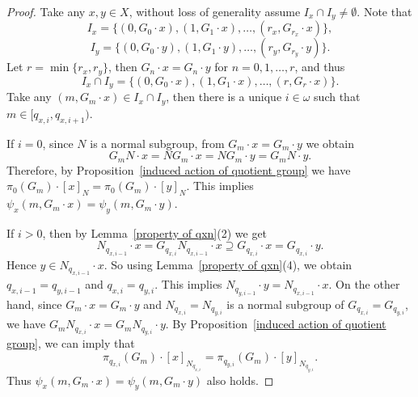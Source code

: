 \documentclass[11pt]{amsart}
\theoremstyle{definition}
\theoremstyle{remark}
\numberwithin{equation}{section}
\begin{document}
\begin{proof}
Take any $x,y\in X$, without loss of generality assume $I_x\cap I_y\neq\emptyset$. Note that
$$I_x=\{(0,G_0\cdot x),(1,G_1\cdot x),\ldots,(r_x,G_{r_x}\cdot x)\},$$
$$I_y=\{(0,G_0\cdot y),(1,G_1\cdot y),\ldots,(r_y,G_{r_y}\cdot y)\}.$$
Let $r=\min\{r_x,r_y\}$, then $G_n\cdot x=G_n\cdot y$ for $n=0,1,\ldots,r$, and thus
$$I_x\cap I_y=\{(0,G_0\cdot x),(1,G_1\cdot x),\ldots,(r,G_r\cdot x)\}.$$
Take any $(m,G_m\cdot x)\in I_x\cap I_y$, then there is a unique $i\in\omega$ such that $m\in[q_{x,i},q_{x,i+1})$.

If $i=0$, since $N$ is a normal subgroup, from $G_m\cdot x=G_m\cdot y$ we obtain
$$G_mN\cdot x=NG_m\cdot x=NG_m\cdot y=G_mN\cdot y.$$
Therefore, by Proposition~\ref{induced action of quotient group} we have $\pi_0(G_m)\cdot[x]_N=\pi_0(G_m)\cdot[y]_N$. This implies $\psi_x(m,G_m\cdot x)=\psi_y(m,G_m\cdot y)$.

    If $i>0$, then by Lemma~\ref{property of qxn}(2) we get
    $$N_{q_{x,i-1}}\cdot x=G_{q_{x,i}}N_{q_{x,i-1}}\cdot x\supseteq G_{q_{x,i}}\cdot x=G_{q_{x,i}}\cdot y.$$
    Hence $y\in N_{q_{x,i-1}}\cdot x$. So using Lemma~\ref{property of qxn}(4), we obtain $q_{x,i-1}=q_{y,i-1}$ and $q_{x,i}=q_{y,i}$. This implies $N_{q_{y,i-1}}\cdot y=N_{q_{x,i-1}}\cdot x$. On the other hand, since $G_m\cdot x=G_m\cdot y$ and $N_{q_{x,i}}=N_{q_{y,i}}$ is a normal subgroup of $G_{q_{x,i}}=G_{q_{y,i}}$, we have $G_mN_{q_{x,i}}\cdot x=G_mN_{q_{y,i}}\cdot y$. By Proposition~\ref{induced action of quotient group}, we can imply that
    $$\pi_{q_{x,i}}(G_m)\cdot[x]_{N_{q_{x,i}}}=\pi_{q_{y,i}}(G_m)\cdot[y]_{N_{q_{y,i}}}.$$
    Thus $\psi_x(m,G_m\cdot x)=\psi_y(m,G_m\cdot y)$ also holds.
\end{proof}
\end{document}
